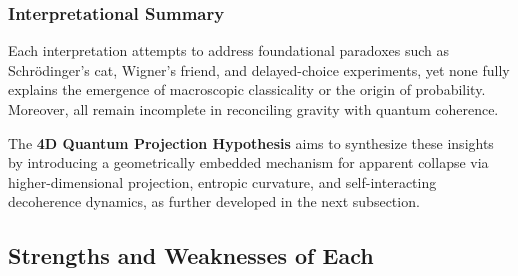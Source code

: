 \documentclass[12pt]{article}
\begin{document}
\subsubsection*{Interpretational Summary}

\begin{table}[H]
\centering
\caption{Formal Comparison of Quantum Interpretations}
\label{tab:interpretation_comparison}
\end{table}


\vspace{1em}
Each interpretation attempts to address foundational paradoxes such as Schrödinger's cat, Wigner’s friend, and delayed-choice experiments, yet none fully explains the emergence of macroscopic classicality or the origin of probability. Moreover, all remain incomplete in reconciling gravity with quantum coherence.

The \textbf{4D Quantum Projection Hypothesis} aims to synthesize these insights by introducing a geometrically embedded mechanism for apparent collapse via higher-dimensional projection, entropic curvature, and self-interacting decoherence dynamics, as further developed in the next subsection.

\subsection{Strengths and Weaknesses of Each}
\end{document}
